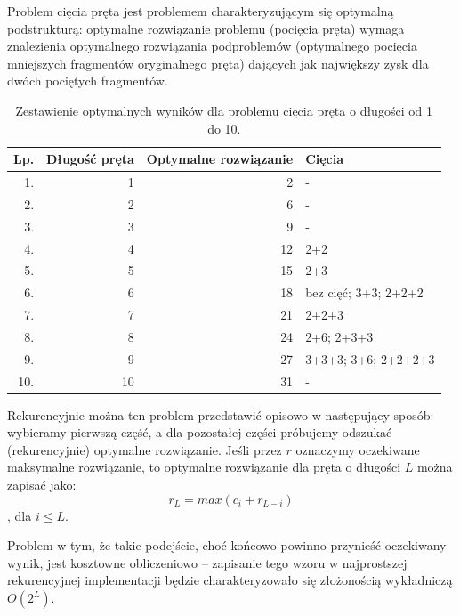 \documentclass[twoside]{article}
\begin{document}
Problem cięcia pręta jest problemem charakteryzującym się optymalną podstrukturą:
optymalne rozwiązanie problemu (pocięcia pręta) wymaga znalezienia optymalnego rozwiązania 
podproblemów (optymalnego pocięcia mniejszych fragmentów oryginalnego pręta) dających jak największy
zysk dla dwóch pociętych fragmentów.

\begin{table}[h]
\centering
\begin{tabular}{|r|r|r|l|}
\hline
Lp. & Długość pręta & Optymalne rozwiązanie & Cięcia                     \\ \hline
1.  & 1             & 2                     & -                          \\ \hline
2.  & 2             & 6                     & -                          \\ \hline
3.  & 3             & 9                     & -                          \\ \hline
4.  & 4             & 12                    & 2+2                        \\ \hline
5.  & 5             & 15                    & 2+3                        \\ \hline
6.  & 6             & 18                    & bez cięć; 3+3; 2+2+2       \\ \hline
7.  & 7             & 21                    & 2+2+3                      \\ \hline
8.  & 8             & 24                    & 2+6; 2+3+3                 \\ \hline
9.  & 9             & 27                    & 3+3+3; 3+6; 2+2+2+3        \\ \hline
10. & 10            & 31                    & -                          \\ \hline
\end{tabular}
\caption{Zestawienie optymalnych wyników dla problemu cięcia pręta o długości od 1 do 10.}
\end{table}

Rekurencyjnie można ten problem przedstawić opisowo w następujący sposób:
wybieramy pierwszą część, a dla pozostałej części próbujemy odszukać (rekurencyjnie) optymalne 
rozwiązanie.
Jeśli przez $r$ oznaczymy oczekiwane maksymalne rozwiązanie, to optymalne rozwiązanie dla 
pręta o długości $L$ można zapisać jako:
$$r_L=max(c_i+r_{L-i})$$, dla $i \leq L$.

Problem w tym, że takie podejście, choć końcowo powinno przynieść oczekiwany wynik, jest kosztowne
obliczeniowo -- zapisanie tego wzoru w najprostszej rekurencyjnej implementacji będzie 
charakteryzowało się złożonością wykładniczą $O(2^L)$.
\end{document}
